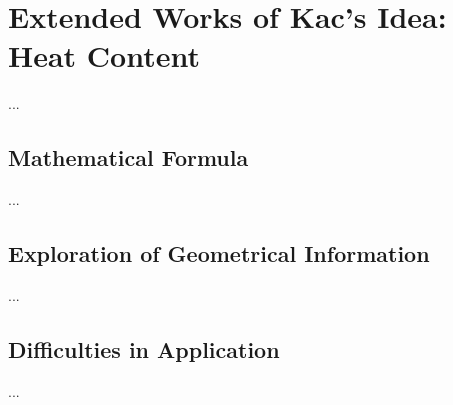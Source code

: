 \section{Extended Works of Kac's Idea: Heat Content}\label{traditinal_heat_content}

...


\subsection{Mathematical Formula}


...


\subsection{Exploration of Geometrical Information}


...


\subsection{Difficulties in Application}


...







